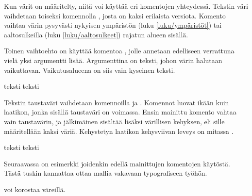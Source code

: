 Kun värit on määritelty, niitä voi käyttää eri komentojen yhteydessä.
Tekstin väri vaihdetaan toiseksi komennolla , josta on
kaksi erilaista versiota. Komento vaihtaa värin pysyvästi nykyisen
ympäristön (luku \ref{luku/ympäristöt}) tai aaltosulkeilla (luku
\ref{luku/aaltosulkeet}) rajatun alueen sisällä.

\begin{koodilohkosis}
\color{nimi}                  %
\color[värimalli]{parametrit} %
\end{koodilohkosis}

Toinen vaihtoehto on käyttää komentoa , jolle
annetaan edelliseen verrattuna vielä yksi argumentti lisää. Argumenttina
on teksti, johon värin halutaan vaikuttavan. Vaikutusalueena on siis
vain kyseinen teksti.

\begin{koodilohkosis}
\textcolor{nimi}{teksti}
\textcolor[värimalli]{parametrit}{teksti}
\end{koodilohkosis}

Tekstin taustaväri vaihdetaan komennoilla  ja
. Komennot luovat ikään kuin laatikon, jonka sisällä
taustaväri on voimassa. Ensin mainittu komento vahtaa vain taustavärin,
ja jälkimäinen sisältää lisäksi värillisen kehyksen, eli sille
määritellään kaksi väriä. Kehystetyn laatikon kehysviivan leveys on
mitassa .

\begin{koodilohkosis}
\colorbox{nimi}{teksti} %
\colorbox[värimalli]{parametrit}{teksti}
\end{koodilohkosis}

Seuraavassa on esimerkki joidenkin edellä mainittujen komentojen
käytöstä. Tästä tuskin kannattaa ottaa mallia vakavaan typografiseen
työhön.

\begin{koodilohkosis}
 \setlength{\fboxrule}{2bp}
\textcolor{pun}{voi korostaa} \colorbox{pun}{väreillä}.
\end{koodilohkosis}

